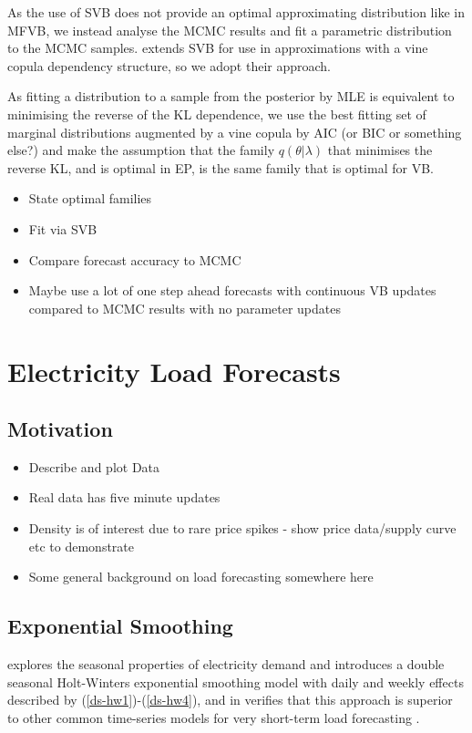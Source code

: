 \documentclass{article}\usepackage[]{graphicx}\usepackage[]{color}
\numberwithin{equation}{section}
\begin{document}
As the use of SVB does not provide an optimal approximating distribution like in MFVB, we instead analyse the MCMC results and fit a parametric distribution to the MCMC samples. \citet{Tran2015} extends SVB for use in approximations with a vine copula dependency structure, so we adopt their approach.

As fitting a distribution to a sample from the posterior by MLE is equivalent to minimising the reverse of the KL dependence, we use the best fitting set of marginal distributions augmented by a vine copula by AIC (or BIC or something else?) and make the assumption that the family $q(\theta | \lambda)$ that minimises the reverse KL, and is optimal in EP, is the same family that is optimal for VB.

\begin{itemize}
\item State optimal families
\item Fit via SVB
\item Compare forecast accuracy to MCMC 
\item Maybe use a lot of one step ahead forecasts with continuous VB updates compared to MCMC results with no parameter updates 
\end{itemize}

\section{Electricity Load Forecasts}
\subsection{Motivation}
\begin{itemize}
\item Describe and plot Data
\item Real data has five minute updates
\item Density is of interest due to rare price spikes - show price data/supply curve etc to demonstrate
\item Some general background on load forecasting somewhere here
\end{itemize}

\subsection{Exponential Smoothing}

\citet{Taylor2003} explores the seasonal properties of electricity demand and introduces a double seasonal Holt-Winters exponential smoothing model with daily and weekly effects described by (\ref{ds-hw1})-(\ref{ds-hw4}), and in \citet{Taylor2008} verifies that this approach is superior to other common time-series models for very short-term load forecasting \citep{Taylor2008}.
\end{document}
